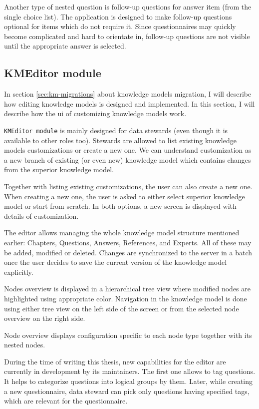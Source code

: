 Another type of nested question is follow-up questions for answer item (from the single choice list).
The application is designed to make follow-up questions optional for items which do not require it.
Since questionnaires may quickly become complicated and hard to orientate in, follow-up questions are not visible until the appropriate answer is selected.

\subsection{KMEditor module}\label{sec:kmeditor-module}

In section \ref{sec:km-migrations} about knowledge models migration, I will describe how editing knowledge models is designed and implemented.
In this section, I will describe how the \gls{ui} of customizing knowledge models work.

\texttt{KMEditor module} is mainly designed for data stewards (even though it is available to other roles too).
Stewards are allowed to list existing knowledge models customizations or create a new one.
We can understand customization as a new branch of existing (or even new) knowledge model which contains changes from the superior knowledge model.

Together with listing existing customizations, the user can also create a new one.
When creating a new one, the user is asked to either select superior knowledge model or start from scratch.
In both options, a new screen is displayed with details of customization.

The editor allows managing the whole knowledge model structure mentioned earlier: Chapters, Questions, Answers, References, and Experts.
All of these may be added, modified or deleted.
Changes are synchronized to the server in a batch once the user decides to save the current version of the knowledge model explicitly.

Nodes overview is displayed in a hierarchical tree view where modified nodes are highlighted using appropriate color.
Navigation in the knowledge model is done using either tree view on the left side of the screen or from the selected node overview on the right side.

Node overview displays configuration specific to each node type together with its nested nodes.

During the time of writing this thesis, new capabilities for the editor are currently in development by its maintainers.
The first one allows to tag questions.
It helps to categorize questions into logical groups by them.
Later, while creating a new questionnaire, data steward can pick only questions having specified tags, which are  relevant for the questionnaire.

